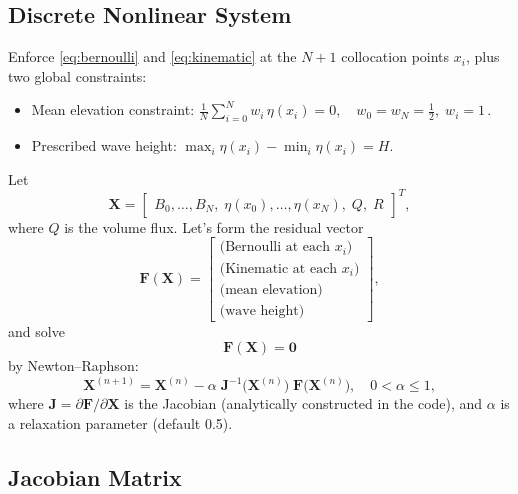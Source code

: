 \documentclass[11pt,letterpaper]{article}
\begin{document}
\subsection{Discrete Nonlinear System}

Enforce \eqref{eq:bernoulli} and \eqref{eq:kinematic} at the $N+1$ collocation points $x_i$, plus two global constraints:
\begin{itemize}
  \item Mean elevation constraint: \(\displaystyle \frac{1}{N}\sum_{i=0}^N w_i\,\eta(x_i)=0,\quad w_0=w_N=\tfrac12,\;w_i=1\,.\)
  \item Prescribed wave height: \(\max_i\eta(x_i)-\min_i\eta(x_i)=H.\)
\end{itemize}
Let
\[
\mathbf{X} = \begin{bmatrix}
B_0,\dots,B_N,\;
\eta(x_0),\dots,\eta(x_N),\;
Q,\;R
\end{bmatrix}^T,
\]
where $Q$ is the volume flux. Let's form the residual vector
\[
\mathbf{F}(\mathbf{X}) = 
\begin{bmatrix}
\text{(Bernoulli at each }x_i)\\
\text{(Kinematic at each }x_i)\\
\text{(mean elevation)}\\
\text{(wave height)}
\end{bmatrix},
\]
and solve 
\[
\mathbf{F}(\mathbf{X}) = \mathbf{0}
\]
by Newton–Raphson:
\begin{equation}
\mathbf{X}^{(n+1)}
= \mathbf{X}^{(n)} 
- \alpha
\;\mathbf{J}^{-1}\!\bigl(\mathbf{X}^{(n)}\bigr)
\;\mathbf{F}\bigl(\mathbf{X}^{(n)}\bigr),
\quad 0<\alpha\le1,
\end{equation}
where $\mathbf{J} = \partial\mathbf{F}/\partial\mathbf{X}$ is the Jacobian (analytically constructed in the code), and $\alpha$ is a relaxation parameter (default 0.5).

\subsection{Jacobian Matrix}
\label{sec:jacobian}
\end{document}
